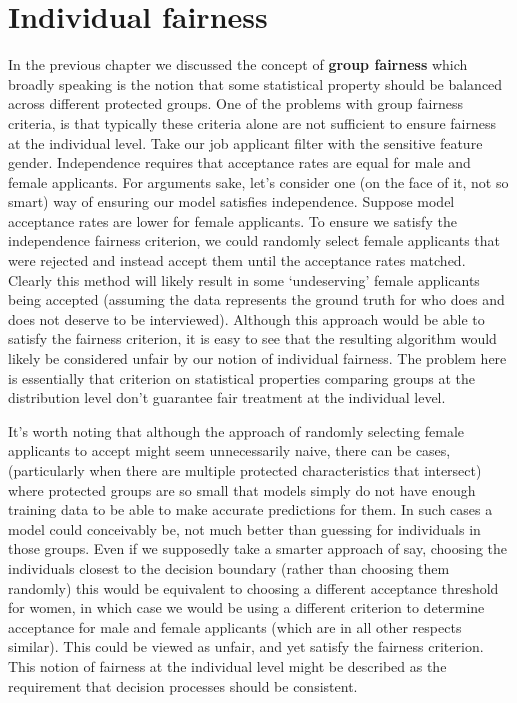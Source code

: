 \section{Individual fairness}\label{sec_IndFair}

In the previous chapter we discussed the concept of \textbf{group fairness} which broadly speaking is the notion that some statistical property should be balanced across different protected groups. One of the problems with group fairness criteria, is that typically these criteria alone are not sufficient to ensure fairness at the individual level. Take our job applicant filter with the sensitive feature gender. Independence requires that acceptance rates are equal for male and female applicants. For arguments sake, let's consider one (on the face of it, not so smart) way of ensuring our model satisfies independence. Suppose model acceptance rates are lower for female applicants. To ensure we satisfy the independence fairness criterion, we could randomly select female applicants that were rejected and instead accept them until the acceptance rates matched. Clearly this method will likely result in some `undeserving' female applicants being accepted (assuming the data represents the ground truth for who does and does not deserve to be interviewed). Although this approach would be able to satisfy the fairness criterion, it is easy to see that the resulting algorithm would likely be considered unfair by our notion of individual fairness. The problem here is essentially that criterion on statistical properties comparing groups at the distribution level don't guarantee fair treatment at the individual level.

It's worth noting that although the approach of randomly selecting female applicants to accept might seem unnecessarily naive, there can be cases, (particularly when there are multiple protected characteristics that intersect) where protected groups are so small that models simply do not have enough training data to be able to make accurate predictions for them. In such cases a model could conceivably be, not much better than guessing for individuals in those groups. Even if we supposedly take a smarter approach of say, choosing the individuals closest to the decision boundary (rather than choosing them randomly) this would be equivalent to choosing a different acceptance threshold for women, in which case we would be using a different criterion to determine acceptance for male and female applicants (which are in all other respects similar). This could be viewed as unfair, and yet satisfy the fairness criterion. This notion of fairness at the individual level might be described as the requirement that decision processes should be consistent.

